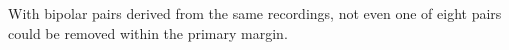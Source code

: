 With bipolar pairs derived from the same recordings, not even one of eight pairs could be removed within the primary margin.
